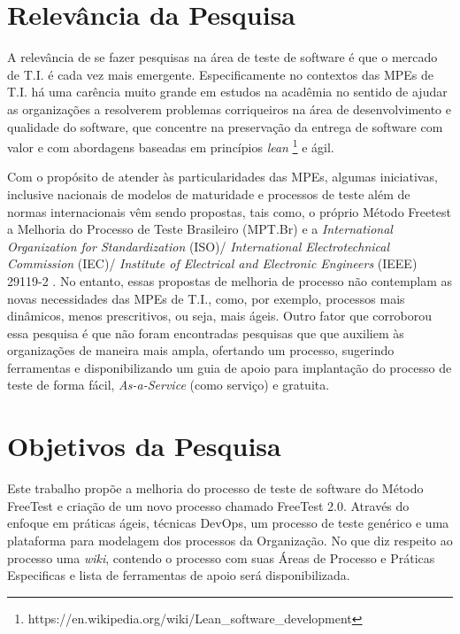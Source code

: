 \section{Relevância da Pesquisa}

A relevância de se fazer pesquisas na área de teste de software é que o mercado de T.I. é cada vez mais emergente. Especificamente no contextos das MPEs de T.I. há uma carência muito grande em estudos na acadêmia no sentido de ajudar as organizações a resolverem problemas corriqueiros na área de desenvolvimento e qualidade do software, que concentre na preservação da entrega de software com valor e com abordagens baseadas em princípios \textit{lean} \footnote{https://en.wikipedia.org/wiki/Lean_software_development} e ágil.

Com o propósito de atender às particularidades das MPEs, algumas iniciativas, inclusive nacionais de modelos de maturidade e processos de teste além de normas internacionais vêm sendo propostas, tais como, o próprio Método Freetest \cite{Camilo-junior2012} a Melhoria do Processo de Teste Brasileiro (MPT.Br) \cite{GuiaMPTbr} e a \textit{International Organization for Standardization} (ISO)/ \textit{International Electrotechnical Commission} (IEC)/ \textit{Institute of Electrical and Electronic Engineers} (IEEE) 29119-2 \cite{Standard2013}. No entanto, essas propostas de melhoria de processo não contemplam as novas necessidades das MPEs de T.I., como, por exemplo, processos mais dinâmicos, menos prescritivos, ou seja, mais ágeis. Outro fator que corroborou essa pesquisa é que não foram encontradas pesquisas que que auxiliem às organizações de maneira mais ampla, ofertando um processo, sugerindo ferramentas e disponibilizando um guia de apoio para implantação do processo de teste de forma fácil, \textit{As-a-Service} (como serviço) e gratuita.

\section{Objetivos da Pesquisa}
\label{cap:objetivos}

Este trabalho propõe a melhoria do processo de teste de software do Método FreeTest \cite{Camilo-junior2012} e criação de um novo processo chamado FreeTest 2.0. Através do enfoque em práticas ágeis, técnicas DevOps, um processo de teste genérico e uma plataforma para modelagem dos processos da Organização. No que diz respeito ao processo uma \textit{wiki}, contendo o processo com suas Áreas de Processo e Práticas Especificas e lista de ferramentas de apoio será disponibilizada. 

